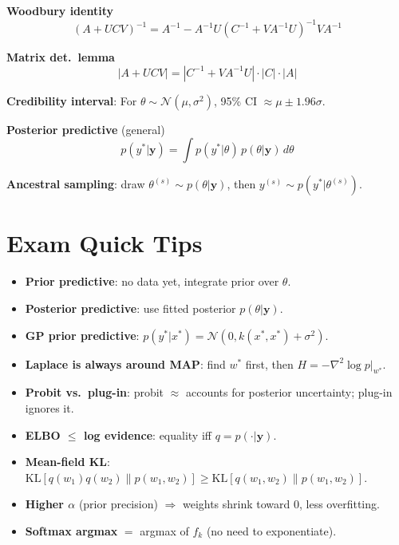 \documentclass[9pt,a4paper]{extarticle}
\newcommand{\N}{\mathcal{N}}
\newcommand{\KL}{\mathrm{KL}}
\renewcommand{\vec}[1]{\bm{#1}}
\begin{document}
\textbf{Woodbury identity}
\[
(A+UCV)^{-1}=A^{-1}-A^{-1}U(C^{-1}+VA^{-1}U)^{-1}VA^{-1}
\]

\textbf{Matrix det.\ lemma}
\[
|A+UCV|=|C^{-1}+VA^{-1}U|\cdot|C|\cdot|A|
\]

\textbf{Credibility interval}: For $\theta\sim\N(\mu,\sigma^2)$, 95\% CI $\approx\mu\pm 1.96\sigma$.

\textbf{Posterior predictive} (general)
\[
p(y^*|\vec{y}) = \int p(y^*|\theta)\,p(\theta|\vec{y})\,d\theta
\]

\textbf{Ancestral sampling}: draw $\theta^{(s)}\sim p(\theta|\vec{y})$, then $y^{(s)}\sim p(y^*|\theta^{(s)})$.

\section{Exam Quick Tips}

\begin{itemize}[noitemsep,topsep=0pt,leftmargin=*]
  \item \textbf{Prior predictive}: no data yet, integrate prior over $\theta$.
  \item \textbf{Posterior predictive}: use fitted posterior $p(\theta|\vec{y})$.
  \item \textbf{GP prior predictive}: $p(y^*|x^*)=\N(0,k(x^*,x^*)+\sigma^2)$.
  \item \textbf{Laplace is always around MAP}: find $w^*$ first, then $H=-\nabla^2\log p|_{w^*}$.
  \item \textbf{Probit vs.\ plug-in}: probit $\approx$ accounts for posterior uncertainty; plug-in ignores it.
  \item \textbf{ELBO $\leq$ log evidence}: equality iff $q=p(\cdot|\vec{y})$.
  \item \textbf{Mean-field KL}: $\KL[q(w_1)q(w_2)\|p(w_1,w_2)] \geq \KL[q(w_1,w_2)\|p(w_1,w_2)]$.
  \item \textbf{Higher $\alpha$} (prior precision) $\Rightarrow$ weights shrink toward 0, less overfitting.
  \item \textbf{Softmax argmax} $=$ argmax of $f_k$ (no need to exponentiate).
\end{itemize}
\end{document}
